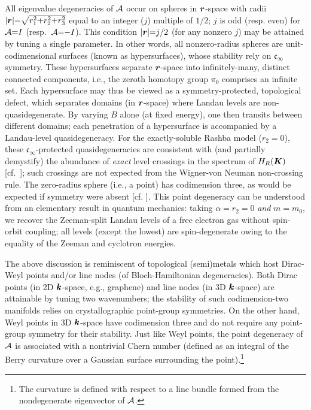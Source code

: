 \documentclass[aps, prb, showpacs, twocolumn, notitlepage, superscriptaddress]{revtex4-1}
\begin{document}
All eigenvalue degeneracies of ${\cal A}$ occur on spheres in $\boldsymbol{r}$-space with radii $|\boldsymbol{r}|{=}\sqrt{r_1^2{+}r_2^2{+}r_3^2}$ equal to an integer ($j$)  multiple of $1/2$;  ${j}$ is odd (resp. even) for  ${\cal A}{=}I$ (resp.\ ${\cal A}{=}{-}I$).  This condition $|\boldsymbol{r}|{=}j/2$ (for any nonzero $j$) may be attained by tuning a single parameter. In other words, all nonzero-radius spheres are unit-codimensional surfaces (known as hypersurfaces), whose stability rely on $\mathfrak{c}_{\infty}$ symmetry. These hypersurfaces separate $\boldsymbol{r}$-space into infinitely-many, distinct connected components, i.e., the zeroth homotopy group $\pi_0$ comprises an infinite set. Each hypersurface may thus be viewed as a symmetry-protected, topological defect, which separates domains (in $\boldsymbol{r}$-space) where Landau levels are non-quasidegenerate. By varying $B$ alone (at fixed energy), one then transits between different domains; each penetration of a hypersurface is accompanied by a Landau-level quasidegeneracy. For the exactly-soluble Rashba model ($r_2{=}0$), these $\mathfrak{c}_{\infty}$-protected quasidegeneracies  are consistent with (and partially demystify)  the abundance of \textit{exact} level crossings in the spectrum of $H_R(\boldsymbol{K})$ [cf.\ ]; such crossings are not expected from the Wigner-von Neuman non-crossing rule\cite{neumann2000behaviour}. The zero-radius sphere (i.e., a point) has codimension three, as would be expected if symmetry were absent [cf. ]. This point degeneracy can be understood from an elementary result in quantum mechanics: taking $\alpha{=}r_2{=}0$ \textit{and} $m{=}m_0$, we recover the Zeeman-split Landau levels of a free electron gas without spin-orbit coupling; all levels (except the lowest) are spin-degenerate owing to the equality of the Zeeman and cyclotron energies\cite{landau2013course}.

The above discussion is reminiscent of topological (semi)metals which host Dirac-Weyl points\cite{wang2012dirac,wan2011topological} and/or line nodes\cite{burkov2011topological} (of Bloch-Hamiltonian degeneracies). Both Dirac points (in 2D $\boldsymbol{k}$-space, e.g., graphene\cite{neto2009electronic}) and line nodes (in 3D $\boldsymbol{k}$-space) are attainable by tuning two wavenumbers; the stability of such codimension-two manifolds relies on crystallographic point-group symmetries. On the other hand, Weyl points in 3D $\boldsymbol{k}$-space have codimension three and do not require any point-group symmetry for their stability. Just like Weyl points, the point degeneracy of ${\cal A}$ is associated with a nontrivial Chern number\cite{TKNN} (defined as an integral of the Berry curvature\cite{berry_quantal_1984} over a Gaussian surface surrounding the point).\footnote{The curvature is defined with respect to a line bundle formed from the nondegenerate eigenvector of ${\cal A}$.} 
\end{document}
